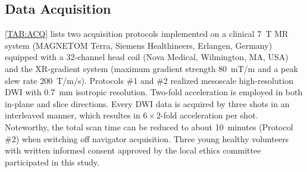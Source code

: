 \documentclass[journal,twoside,web]{ieeecolor}
\begin{document}
\begin{table}
	\end{table}

	\subsection{Data Acquisition}

	\cref{TAB:ACQ} lists two acquisition protocols implemented on
	a clinical \SI{7}{\tesla} MR system
	(MAGNETOM Terra, Siemens Healthineers, Erlangen, Germany)
	equipped with a 32-channel head coil (Nova Medical, Wilmington, MA, USA)
	and the XR-gradient system
	(maximum gradient strength \SI{80}{\milli\tesla/\meter} and
	a peak slew rate \SI{200}{\tesla/\meter/\second}).
	Protocols \#1 and \#2 realized mesoscale high-resolution DWI with \SI{0.7}{mm}
	isotropic resolution. Two-fold acceleration is employed
	in both in-plane and slice directions.
	Every DWI data is acquired by three shots in an interleaved manner,
	which resultes in $6 \times 2$-fold acceleration per shot.
	Noteworthy, the total scan time can be reduced to about 10~minutes
	(Protocol \#2) when switching off navigator acquisition.
	Three young healthy volunteers with written informed consent
	approved by the local ethics committee
	participated in this study.
\end{document}
